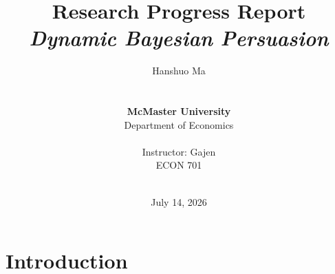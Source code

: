 \documentclass[12pt]{article}
\begin{document}
\title{{\Huge \textbf{Research Progress Report}{\large\linebreak\\}}{\Large \textit{Dynamic Bayesian Persuasion}\linebreak\linebreak}}
\author{Hanshuo Ma
\\ \\ \\
\textbf{McMaster University} \\
Department of Economics \\ \\
Instructor: Gajen\\
ECON 701 \\ \\}
\date{July 14, 2026}

\maketitle

\newpage
\tableofcontents
\newpage

\section{Introduction}\label{Introduction}
\end{document}
